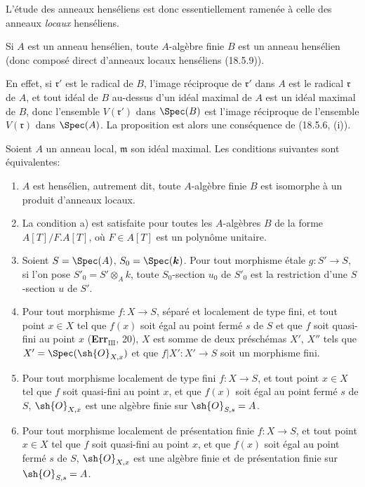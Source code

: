 L'étude des anneaux henséliens est donc essentiellement ramenée à celle des anneaux \emph{locaux} henséliens.

\begin{proposition}[18.5.10]
\label{IV.18.5.10}
Si $A$ est un anneau hensélien, toute $A$-algèbre finie $B$ est un anneau hensélien \textup{(donc} composé direct d'anneaux locaux henséliens \textup{(18.5.9))}.
\end{proposition}

En effet, si $\mathfrak r'$ est le radical de $B$, l'image réciproque de $\mathfrak r'$ dans $A$ est le radical $\mathfrak r$ de $A$, et tout idéal de $B$ au-dessus d'un idéal maximal de $A$ est un idéal maximal de $B$, donc l'ensemble $V(\mathfrak r')$ dans $\Spec(B)$ est l'image réciproque de l'ensemble $V(\mathfrak r)$ dans $\Spec(A)$. La proposition est alors une conséquence de (18.5.6, (i)).

\begin{theorem}[18.5.11]
\label{IV.18.5.11}
Soient $A$ un anneau local, $\mathfrak m$ son idéal maximal. Les conditions suivantes sont équivalentes:
\begin{enumerate}
  \item[\textup{a)}] $A$ est hensélien, autrement dit, toute $A$-algèbre finie $B$ est isomorphe à un produit d'anneaux locaux.


  \item[\textup{a$'$)}] La condition \textup{a)} est satisfaite pour toutes les $A$-algèbres $B$ de la forme $A[T]/F.A[T]$, où $F\in A[T]$ est un polynôme unitaire.
  \item[\textup{b)}] Soient $S=\Spec(A)$, $S_0=\Spec(\boldsymbol{k})$. Pour tout morphisme étale $g:S'\to S$, si l'on pose $S'_0=S'\otimes_A k$, toute $S_0$-section $u_0$ de $S'_0$ est la restriction d'une $S$-section $u$ de $S'$.
  \item[\textup{c)}] Pour tout morphisme $f:X\to S$, séparé et localement de type fini, et tout point $x\in X$ tel que $f(x)$ soit égal au point fermé $s$ de $S$ et que $f$ soit quasi-fini au point $x$ \textup{(\textbf{Err}$_{\mathrm{III}}$, 20)}, $X$ est somme de deux préschémas $X'$, $X''$ tels que $X'=\Spec(\sh{O}_{X,x})$ et que $f|X':X'\to S$ soit un morphisme \textup{fini}.
  \item[\textup{c$'$)}] Pour tout morphisme localement de type fini $f:X\to S$, et tout point $x\in X$ tel que $f$ soit quasi-fini au point $x$, et que $f(x)$ soit égal au point fermé $s$ de $S$, $\sh{O}_{X,x}$ est une algèbre finie sur $\sh{O}_{S,s}=A$.
  \item[\textup{c$''$)}] Pour tout morphisme localement de présentation finie $f:X\to S$, et tout point $x\in X$ tel que $f$ soit quasi-fini au point $x$, et que $f(x)$ soit égal au point fermé $s$ de $S$, $\sh{O}_{X,x}$ est une algèbre finie et de présentation finie sur $\sh{O}_{S,s}=A$.
\end{enumerate}
\end{theorem}

